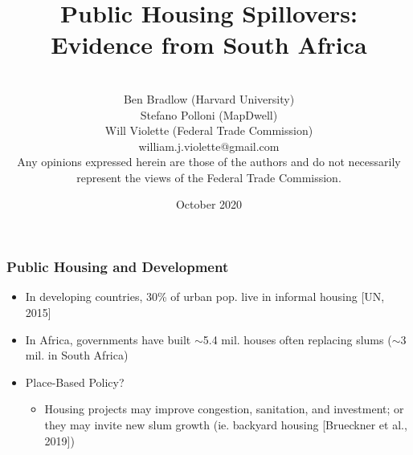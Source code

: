 \documentclass[aspectratio=32]{beamer}
\title{Public Housing Spillovers: \\Evidence from South Africa} %
\author{\\Ben Bradlow (Harvard University) \\ Stefano Polloni (MapDwell)\\ Will Violette (Federal Trade Commission) \\ william.j.violette@gmail.com \\[2em] Any opinions expressed herein are those of the authors
and do not necessarily represent the views of the
Federal Trade Commission.}
\date{October 2020} %
\begin{document}
\beamertemplatenavigationsymbolsempty

\begin{frame}
\titlepage %
\end{frame}



\begin{frame}
\frametitle{Public Housing and Development}
\centering

\begin{itemize}
  \item In developing countries, 30\% of urban pop. live in informal housing [UN, 2015]
  \vspace{2mm}
  \item In Africa, governments have built $\sim$5.4 mil. houses often replacing slums ($\sim$3 mil. in South Africa)
  \vspace{2mm}
  \item Place-Based Policy?
  \begin{itemize}
  \item Housing projects may improve congestion, sanitation, and investment; or they may invite new slum growth (ie. backyard housing [Brueckner et al., 2019])
\end{itemize}
  \vspace{2mm}

\end{itemize}

\end{frame}
\end{document}

